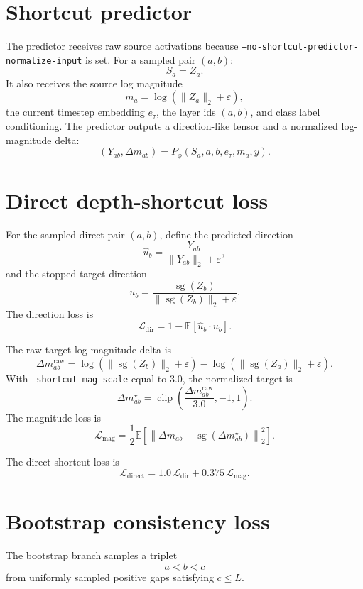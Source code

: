 \documentclass[11pt]{article}
\begin{document}
\section{Shortcut predictor}

The predictor receives raw source activations because
\texttt{--no-shortcut-predictor-normalize-input} is set. For a sampled pair
$(a,b)$:
\[
  S_a = Z_a.
\]
It also receives the source log magnitude
\[
  m_a = \log\left(\|Z_a\|_2+\varepsilon\right),
\]
the current timestep embedding $e_\tau$, the layer ids $(a,b)$, and class label
conditioning. The predictor outputs a direction-like tensor and a normalized
log-magnitude delta:
\[
  (Y_{ab},\Delta m_{ab})
  =
  P_\phi(S_a,a,b,e_\tau,m_a,y).
\]

\section{Direct depth-shortcut loss}

For the sampled direct pair $(a,b)$, define the predicted direction
\[
  \hat u_b =
  \frac{Y_{ab}}{\|Y_{ab}\|_2+\varepsilon},
\]
and the stopped target direction
\[
  u_b =
  \frac{\operatorname{sg}(Z_b)}
       {\|\operatorname{sg}(Z_b)\|_2+\varepsilon}.
\]
The direction loss is
\[
  \mathcal{L}_{\mathrm{dir}}
  =
  1-\mathbb{E}\left[\hat u_b\cdot u_b\right].
\]

The raw target log-magnitude delta is
\[
  \Delta m_{ab}^{\mathrm{raw}}
  =
  \log\left(\|\operatorname{sg}(Z_b)\|_2+\varepsilon\right)
  -
  \log\left(\|\operatorname{sg}(Z_a)\|_2+\varepsilon\right).
\]
With \texttt{--shortcut-mag-scale} equal to $3.0$, the normalized target is
\[
  \Delta m_{ab}^{\star}
  =
  \operatorname{clip}
  \left(
    \frac{\Delta m_{ab}^{\mathrm{raw}}}{3.0},
    -1,1
  \right).
\]
The magnitude loss is
\[
  \mathcal{L}_{\mathrm{mag}}
  =
  \frac{1}{2}
  \mathbb{E}
  \left[
    \left\|
      \Delta m_{ab}
      -
      \operatorname{sg}(\Delta m_{ab}^{\star})
    \right\|_2^2
  \right].
\]

The direct shortcut loss is
\[
  \mathcal{L}_{\mathrm{direct}}
  =
  1.0\,\mathcal{L}_{\mathrm{dir}}
  +
  0.375\,\mathcal{L}_{\mathrm{mag}}.
\]

\section{Bootstrap consistency loss}

The bootstrap branch samples a triplet
\[
  a<b<c
\]
from uniformly sampled positive gaps satisfying $c\le L$.
\end{document}
